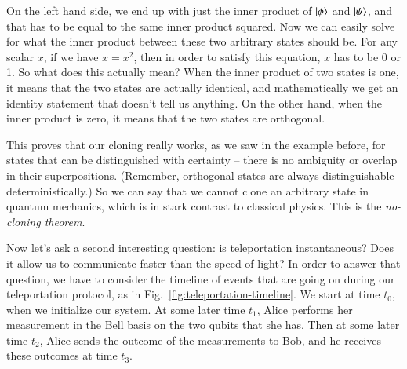 On the left hand side, we end up with just the inner product of $\left| \phi \right\rangle$ and $\left| \psi \right\rangle$, and that has to be equal to the same inner product squared. Now we can easily solve for what the inner product between these two arbitrary states should be. For any scalar $x$, if we have $x = x^2$, then in order to satisfy this equation, $x$ has to be 0 or 1. So what does this actually mean? When the inner product of two states is one, it means that the two states are actually identical, and mathematically we get an identity statement that doesn't tell us anything. On the other hand, when the inner product is zero, it means that the two states are orthogonal.

This proves that our cloning really works, as we saw in the example before, for states that can be distinguished with certainty -- there is no ambiguity or overlap in their superpositions. (Remember, orthogonal states are always distinguishable deterministically.) So we can say that we cannot clone an arbitrary state in quantum mechanics, which is in stark contrast to classical physics. This is the \emph{no-cloning theorem}.

Now let's ask a second interesting question: is teleportation instantaneous? Does it allow us to communicate faster than the speed of light? In order to answer that question, we have to consider the timeline of events that are going on during our teleportation protocol, as in Fig.~\ref{fig:teleportation-timeline}. We start at time $t_0$, when we initialize our system. At some later time $t_1$, Alice performs her measurement in the Bell basis on the two qubits that she has. Then at some later time $t_2$, Alice sends the outcome of the measurements to Bob, and he receives these outcomes at time $t_3$.

